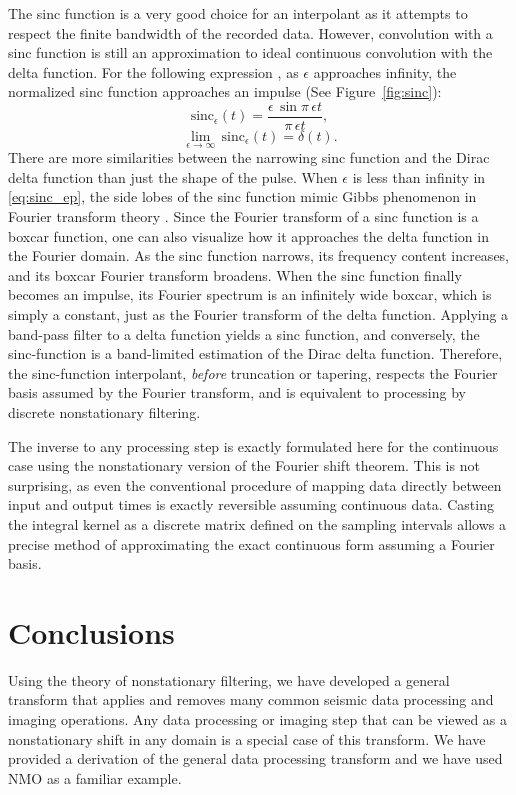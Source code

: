 The sinc function is a very good choice for an interpolant as it attempts to respect the finite bandwidth of the recorded data.
However, convolution with a sinc function is still an approximation to ideal continuous convolution with the delta function.
For the following expression \cite{elliott_rao82}, as $\epsilon$ approaches infinity, the normalized sinc function approaches an impulse (See Figure~\ref{fig:sinc}):
\begin{equation}
	\label{eq:sinc_ep}
	\mbox{sinc}_{\epsilon} \left( t \right) = \frac{\epsilon \, \sin{\pi \, \epsilon t}}{\pi \, \epsilon t},
\end{equation} 
\begin{equation}
	\label{eq:delta_sinc}
	\lim_{\epsilon \to \infty} \, \mbox{sinc}_{\epsilon} \left( t \right) = \delta \left( t \right).
\end{equation} 
There are more similarities between the narrowing sinc function and the Dirac delta function than just the shape of the pulse.
When $\epsilon$ is less than infinity in \ref{eq:sinc_ep}, the side lobes of the sinc function mimic Gibbs phenomenon in Fourier transform theory \cite{papoulis62}.
Since the Fourier transform of a sinc function is a boxcar function, one can also visualize how it approaches the delta function in the Fourier domain.
As the sinc function narrows, its frequency content increases, and its boxcar Fourier transform broadens.
When the sinc function finally becomes an impulse, its Fourier spectrum is an infinitely wide boxcar, which is simply a constant, just as the Fourier transform of the delta function.
Applying a band-pass filter to a delta function yields a sinc function, and conversely, the sinc-function is a band-limited estimation of the Dirac delta function.
Therefore, the sinc-function interpolant, \textit{before} truncation or tapering, respects the Fourier basis assumed by the Fourier transform, and is equivalent to processing by discrete nonstationary filtering.
  
The inverse to any processing step is exactly formulated here for the continuous case using the nonstationary version of the Fourier shift theorem.
This is not surprising, as even the conventional procedure of mapping data directly between input and output times is exactly reversible assuming continuous data.
Casting the integral kernel as a discrete matrix defined on the sampling intervals allows a precise method of approximating the exact continuous form assuming a Fourier basis.

\section{Conclusions}
Using the theory of nonstationary filtering, we have developed a general transform that applies and removes many common seismic data processing and imaging operations.  
Any data processing or imaging step that can be viewed as a nonstationary shift in any domain is a special case of this transform.  
We have provided a derivation of the general data processing transform and we have used NMO as a familiar example.

